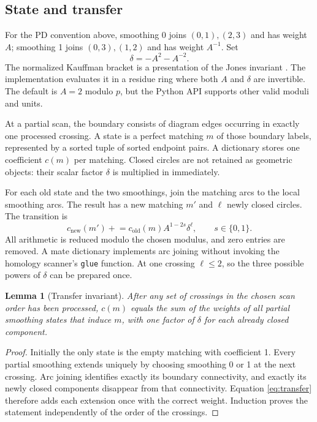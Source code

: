 \documentclass[11pt,letterpaper]{article}
\newtheorem{lemma}[theorem]{Lemma}
\theoremstyle{definition}
\begin{document}
\subsection{State and transfer}

For the PD convention above, smoothing 0 joins $(0,1),(2,3)$ and has weight $A$;
smoothing 1 joins $(0,3),(1,2)$ and has weight $A^{-1}$. Set
\[
 \delta=-A^2-A^{-2}.
\]
The normalized Kauffman bracket is a presentation of the Jones invariant
\cite{kauffman}. The implementation evaluates it in a residue ring where both
$A$ and $\delta$ are invertible. The default is $A=2$ modulo $p$, but the Python
API supports other valid moduli and units.

At a partial scan, the boundary consists of diagram edges occurring in exactly
one processed crossing. A state is a perfect matching $m$ of those boundary
labels, represented by a sorted tuple of sorted endpoint pairs. A dictionary
stores one coefficient $c(m)$ per matching. Closed circles are not retained as
geometric objects: their scalar factor $\delta$ is multiplied in immediately.

For each old state and the two smoothings, join the matching arcs to the local
smoothing arcs. The result has a new matching $m'$ and $\ell$ newly closed
circles. The transition is
\begin{equation}\label{eq:transfer}
 c_{\mathrm{new}}(m')\mathrel{+}=
 c_{\mathrm{old}}(m) A^{1-2s}\delta^\ell,\qquad s\in\{0,1\}.
\end{equation}
All arithmetic is reduced modulo the chosen modulus, and zero entries are
removed. A mate dictionary implements arc joining without invoking the
homology scanner's \texttt{glue} function. At one crossing $\ell\leq2$, so the
three possible powers of $\delta$ can be prepared once.

\begin{lemma}[Transfer invariant]
After any set of crossings in the chosen scan order has been processed,
$c(m)$ equals the sum of the weights of all partial smoothing states that
induce $m$, with one factor of $\delta$ for each already closed component.
\end{lemma}
\begin{proof}
Initially the only state is the empty matching with coefficient 1. Every
partial smoothing extends uniquely by choosing smoothing 0 or 1 at the next
crossing. Arc joining identifies exactly its boundary connectivity, and exactly
its newly closed components disappear from that connectivity. Equation
\eqref{eq:transfer} therefore adds each extension once with the correct weight.
Induction proves the statement independently of the order of the crossings.
\end{proof}
\end{document}
